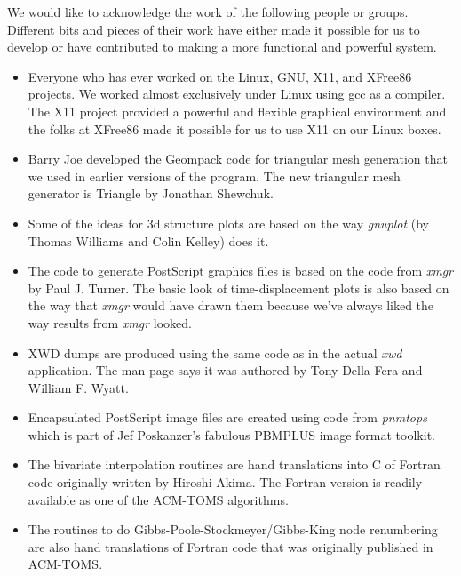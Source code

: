 \label{foreword.acknowledgements}

We would like to acknowledge the work of the following people or groups.
Different bits and pieces of their work have either made it possible for us
to develop \felt{} or have contributed to making \felt{} a more functional
and powerful system.

\begin{itemize}
\item
Everyone who has ever worked on the Linux, GNU, X11, and XFree86 projects.
We worked almost exclusively under Linux using gcc as a compiler.  The
X11 project provided a powerful and flexible graphical environment and the
folks at XFree86 made it possible for us to use X11 on our Linux boxes.
\item
Barry Joe developed the Geompack code for triangular mesh generation that
we used in earlier versions of the program.  The new triangular mesh
generator is Triangle by Jonathan Shewchuk.
\item
Some of the ideas for 3d structure plots are based on the way {\it gnuplot}
(by Thomas Williams and Colin Kelley) does it.
\item
The code to generate PostScript graphics files is based on the code
from {\it xmgr} by Paul J. Turner.  The basic look of time-displacement
plots is also based on the way that {\it xmgr} would have drawn them 
because we've always liked the way results from {\it xmgr} looked.
\item
XWD dumps are produced using the same code as in the actual {\it xwd}
application.  The man page says it was authored by Tony Della Fera and
William F. Wyatt.
\item 
Encapsulated PostScript image files are created using code from {\it pnmtops}
which is part of Jef Poskanzer's fabulous PBMPLUS image format toolkit.
\item
The bivariate interpolation routines are hand translations into C of 
Fortran code originally written by Hiroshi Akima.  The Fortran version
is readily available as one of the ACM-TOMS algorithms.
\item
The routines to do Gibbs-Poole-Stockmeyer/Gibbs-King node renumbering
are also hand translations of Fortran code that was originally published
in ACM-TOMS.
\end{itemize}

\newpage{\pagestyle{empty}\cleardoublepage}
